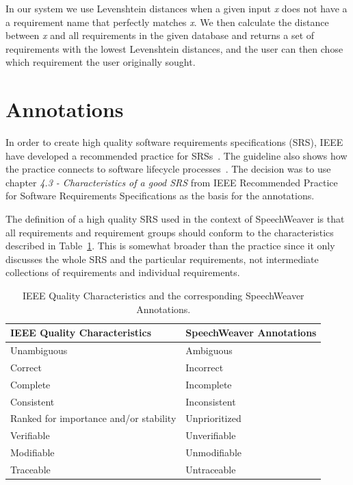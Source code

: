 In our system we use Levenshtein distances when a given input \emph{x} does not have a a requirement name that perfectly matches \emph{x}. We then calculate the distance between \emph{x} and all requirements in the given database and returns a set of requirements with the lowest Levenshtein distances, and the user can then chose which requirement the user originally sought.

\section{Annotations}
In order to create high quality software requirements specifications (SRS), IEEE have developed a recommended practice for SRSs~\citep{IEEE830}. The guideline also shows how the practice connects to software lifecycle processes~\citep{IEEE12207}. The decision was to use chapter \textit{4.3 - Characteristics of a good SRS} from IEEE Recommended Practice for Software Requirements Specifications as the basis for the annotations. 

The definition of a high quality SRS used in the context of SpeechWeaver is that all requirements and requirement groups should conform to the characteristics described in Table~\ref{tab:anots}. This is somewhat broader than the practice since it only discusses the whole SRS and the particular requirements, not intermediate collections of requirements and individual requirements. 

\begin{table}[h]
\centering
\caption{IEEE Quality Characteristics and the corresponding SpeechWeaver Annotations.}

    \begin{tabular}{ l  l }
        \hline
        IEEE Quality Characteristics & SpeechWeaver Annotations \\
        \hline
        Unambiguous & Ambiguous \\
        Correct & Incorrect \\ 
        Complete & Incomplete \\
        Consistent & Inconsistent \\
        Ranked for importance and/or stability & Unprioritized \\
        Verifiable & Unverifiable \\
        Modifiable & Unmodifiable \\
        Traceable & Untraceable \\
        \end{tabular}   
\label{tab:anots}
\end{table}

